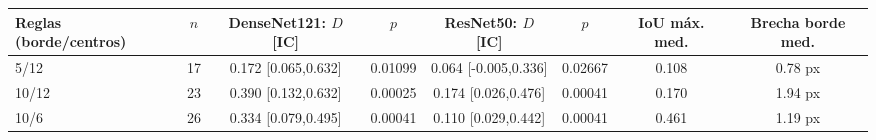\begin{tabular}{lccccccc}
\toprule
Reglas (borde/centros) & $n$ & DenseNet121: $D$ [IC] & $p$ & ResNet50: $D$ [IC] & $p$ & IoU máx. med. & Brecha borde med.\\
\midrule
5/12 & 17 & 0.172 [0.065,0.632] & 0.01099 & 0.064 [-0.005,0.336] & 0.02667 & 0.108 & 0.78 px\\
10/12 & 23 & 0.390 [0.132,0.632] & 0.00025 & 0.174 [0.026,0.476] & 0.00041 & 0.170 & 1.94 px\\
10/6 & 26 & 0.334 [0.079,0.495] & 0.00041 & 0.110 [0.029,0.442] & 0.00041 & 0.461 & 1.19 px\\
\bottomrule
\end{tabular}